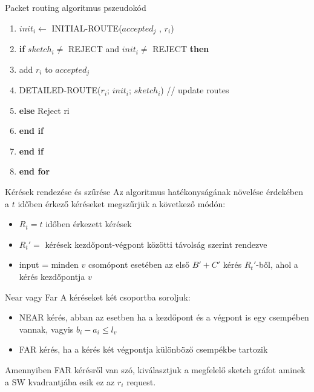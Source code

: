 \documentclass[10pt]{beamer}
\begin{document}
\begin{frame}{Packet routing algoritmus pszeudokód}
  \begin{enumerate}
  	\setcounter{enumi}{\theenumTemp}
  	\item \quad \quad $ init_i \leftarrow $ INITIAL-ROUTE($ accepted_j $ , $ r_i $)
  	\item \quad \quad \textbf{if} $ sketch_i \neq $ REJECT and $ init_i \neq $ REJECT \textbf{then}
	\item \quad \quad \quad add $ r_i $ to $ accepted_j $
	\item \quad \quad \quad DETAILED-ROUTE($ r_i $; $ init_i $; $ sketch_i $) // update routes
	\item \quad \quad \textbf{else} Reject ri
	\item \quad \quad \textbf{end if}
	\item \quad \textbf{end if}
	\item \textbf{end for}
  \end{enumerate}
\end{frame}

\begin{frame}{Kérések rendezése és szűrése}
	Az algoritmus hatékonyságának növelése érdekében a $t$ időben érkező kéréseket megszűrjük a következő módón:
	\begin{itemize}
		\item $ R_t = t $ időben érkezett kérések
		\item $R_t' = $ kérések kezdőpont-végpont közötti távolság szerint rendezve
		\item input = minden $v$ csomópont esetében az első $B' + C'$ kérés $R_t'$-ből, ahol a kérés kezdőpontja $v$
	\end{itemize}
	
\end{frame}

\begin{frame}{Near vagy Far}
  A kéréseket két csoportba soroljuk:
  \begin{itemize}
  	\item NEAR kérés, abban az esetben ha a kezdőpont és a végpont is egy csempében vannak, vagyis $b_i - a_i \leq l_v$
  	\item FAR kérés, ha a kérés két végpontja különböző csempékbe tartozik
  \end{itemize}
  Amennyiben FAR kérésről van szó, kiválasztjuk a megfelelő sketch gráfot aminek a SW kvadrantjába esik ez az $ r_i $ request.
\end{frame}
\end{document}
